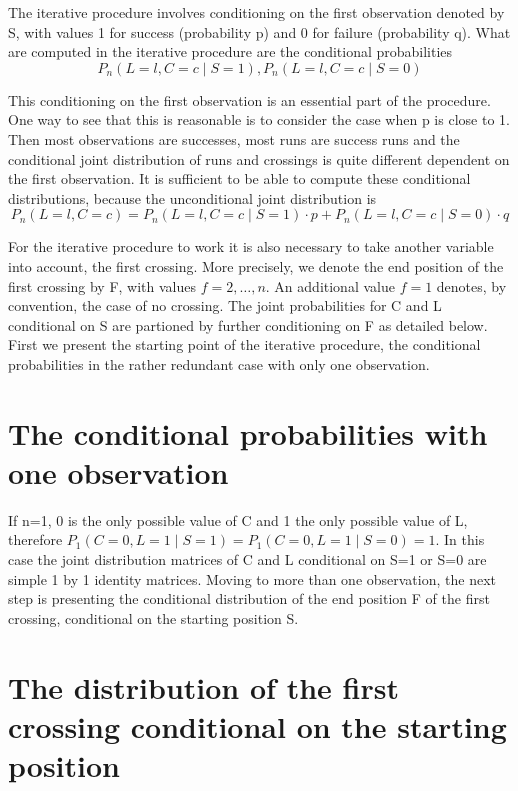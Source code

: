 The iterative procedure involves conditioning on the first observation denoted by S, with values 1 for success (probability p) and 0 for failure (probability q). What are computed in the iterative procedure are the conditional probabilities $$P_n (L=l,C=c \mid S=1), P_n (L=l,C=c \mid S=0)$$

This conditioning on the first observation is an essential part of the procedure. One way to see that this is reasonable is to consider the case when p is close to 1. Then most observations are successes, most runs are success runs and the conditional joint distribution of runs and crossings is quite different dependent on the first observation. It is sufficient to be able to compute these conditional distributions, because the unconditional joint distribution is
$$P_n (L=l,C=c) = P_n (L=l,C=c \mid S=1) \cdot p + P_n (L=l,C=c \mid S=0) \cdot q$$

For the iterative procedure to work it is also necessary to take another variable into account, the first crossing. More precisely, we denote the end position of the first crossing by F, with values $f=2, \ldots ,n$. An additional value $f=1$ denotes, by convention, the case of no crossing. The joint probabilities for C and L conditional on S are partioned by further conditioning on F as detailed below. First we present the starting point of the iterative procedure, the conditional probabilities in  the rather redundant case with only one observation.

\section{The conditional probabilities with one observation}

If n=1, 0 is the only possible value of C and 1 the only possible value of L, therefore $P_1 (C=0,L=1 \mid S=1) = P_1 (C=0,L=1 \mid S=0) = 1$. In this case the joint distribution matrices of C and L conditional on S=1 or S=0 are simple 1 by 1 identity matrices. Moving to more than one observation, the next step is presenting the conditional distribution of the end position F of the first crossing, conditional on the starting position S.

\section{The distribution of the first crossing conditional on the starting position}

